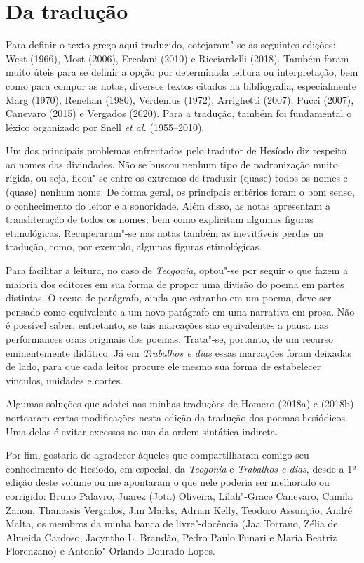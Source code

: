 \section*{Da tradução}

Para definir o texto grego aqui traduzido, cotejaram"-se as seguintes
edições: West (1966), Most (2006), Ercolani (2010) e Ricciardelli (2018). Também foram
muito úteis para se definir a opção por determinada leitura ou
interpretação, bem como para compor as notas, diversos textos citados na
bibliografia, especialmente Marg (1970), Renehan (1980), Verdenius (1972), Arrighetti
(2007), Pucci (2007), Canevaro (2015) e Vergados (2020). Para a tradução, também foi
fundamental o léxico organizado por Snell \emph{et al.} (1955--2010).

Um dos principais problemas enfrentados pelo tradutor de Hesíodo
diz respeito ao nomes das divindades. Não se buscou
nenhum tipo de padronização muito rígida, ou seja, ficou"-se entre os
extremos de traduzir (quase) todos os nomes e (quase) nenhum nome. De
forma geral, os principais critérios foram o bom senso, o conhecimento
do leitor e a sonoridade. Além disso, as notas apresentam a
transliteração de todos os nomes, bem como explicitam algumas figuras
etimológicas. Recuperaram"-se nas notas também as inevitáveis perdas na tradução, como, por exemplo, algumas figuras etimológicas.

Para facilitar a leitura, no caso de \textit{Teogonia},
optou"-se por seguir o que fazem a maioria dos
editores em sua forma de propor uma divisão do poema em partes
distintas. O recuo de parágrafo, ainda que estranho em um poema, deve
ser pensado como equivalente a um novo parágrafo em uma narrativa em
prosa. Não é possível saber, entretanto, se tais marcações são
equivalentes a pausa nas performances orais originais dos poemas.
Trata"-se, portanto, de um recurso eminentemente didático.
Já em \textit{Trabalhos e dias} essas marcações foram deixadas de lado,
para que cada leitor procure ele mesmo sua forma de estabelecer vínculos, unidades e cortes.

Algumas soluções que adotei nas minhas traduções de Homero (2018a) e
(2018b) nortearam certas modificações nesta edição da tradução dos poemas
hesiódicos. Uma delas é evitar excessos no uso da ordem sintática
indireta.

Por fim, gostaria de agradecer àqueles que compartilharam comigo seu
conhecimento de Hesíodo, em especial, da \emph{Teogonia} e \textit{Trabalhos e dias}, desde a 1ª edição deste volume ou me apontaram o que nele poderia ser melhorado ou
corrigido: Bruno Palavro, Juarez (Jota) Oliveira,
Lilah"-Grace Canevaro, Camila Zanon, Thanassis Vergados, Jim Marks, Adrian Kelly,
Teodoro Assunção, André Malta, os membros da minha banca de
livre"-docência (Jaa Torrano, Zélia de Almeida Cardoso, Jacyntho L.
Brandão, Pedro Paulo Funari e Maria Beatriz Florenzano) e
Antonio"-Orlando Dourado Lopes.


